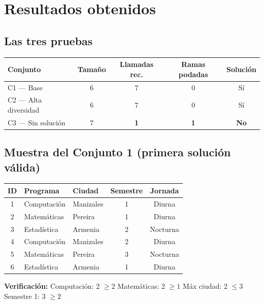 \documentclass[11pt, a4paper]{article}
\begin{document}
\section{Resultados obtenidos}

\subsection{Las tres pruebas}

\begin{center}
\begin{tabular}{lcccc}
  \toprule
  \textbf{Conjunto} & \textbf{Tamaño} & \textbf{Llamadas rec.} & \textbf{Ramas podadas} & \textbf{Solución} \\
  \midrule
  C1 — Base              & 6 & 7  & 0  & Sí \\
  C2 — Alta diversidad   & 6 & 7  & 0  & Sí \\
  C3 — Sin solución      & 7 & \textbf{1}  & \textbf{1}  & \textbf{No} \\
  \bottomrule
\end{tabular}
\end{center}

\subsection{Muestra del Conjunto 1 (primera solución válida)}

\begin{center}
\begin{tabular}{cllcc}
  \toprule
  \textbf{ID} & \textbf{Programa} & \textbf{Ciudad} & \textbf{Semestre} & \textbf{Jornada} \\
  \midrule
  1 & Computación & Manizales & 1 & Diurna   \\
  2 & Matemáticas & Pereira   & 1 & Diurna   \\
  3 & Estadística & Armenia   & 2 & Nocturna \\
  4 & Computación & Manizales & 2 & Diurna   \\
  5 & Matemáticas & Pereira   & 3 & Nocturna \\
  6 & Estadística & Armenia   & 1 & Diurna   \\
  \bottomrule
\end{tabular}
\end{center}

\textbf{Verificación:} Computación: 2 $\geq 2$ \checkmark \quad Matemáticas: 2 $\geq 1$ \checkmark \quad Máx ciudad: 2 $\leq 3$ \checkmark \quad Semestre 1: 3 $\geq 2$ \checkmark
\end{document}
